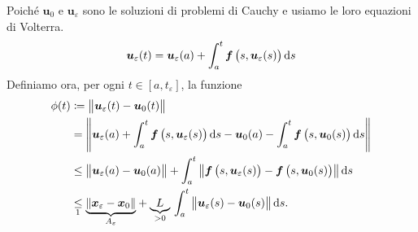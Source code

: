 {\begin{enumerate}
        Poiché $ \bm{u}_0 $ e $ \bm{u}_{ \varepsilon} $ sono le soluzioni di problemi di Cauchy e usiamo le loro equazioni di Volterra. \[
            \bm{u}_{ \varepsilon} (t) =\bm{u}_{ \varepsilon} (a) + \int_{a}^{t} \bm{f}\left(s, \bm{u}_{ \varepsilon}(s)\right) \dif s
        \]Definiamo ora, per ogni $ t \in [a,t_{ \varepsilon} ] $, la funzione \begin{align*}
            \phi(t) &\coloneqq \norma{\bm{u}_{ \varepsilon}(t)-\bm{u}_{ 0}(t)}\\ &= \norma{%
            \bm{u}_{ \varepsilon}(a) + \int_{a}^{t} \bm{f}\left(s,\bm{u}_{ \varepsilon}(s)\right) \dif s - \bm{u}_0(a) - \int_{a}^{t} \bm{f}\left(s, \bm{u}_0(s)\right)\dif s 
            }\\ 
            &\le \norma{\bm{u}_{ \varepsilon}(a)-\bm{u}_0(a)} + \int_{a}^{t}\norma{\bm{f}\left(s, \bm{u}_{ \varepsilon}(s)\right) - \bm{f}\left(s, \bm{u}_0(s)\right)}\dif s \\ 
            &\underset{\footnotemark}{\le} \parentesi{A_{ \varepsilon} }{%
                \norma{\bm{x}_{ \varepsilon} -\bm{x}_0} 
            } + \underbrace{L}_{>0}\,\int_{a}^{t}\norma{\bm{u}_{ \varepsilon}(s) - \bm{u}_0(s)}\dif s .
        \end{align*} 


\end{enumerate}}
